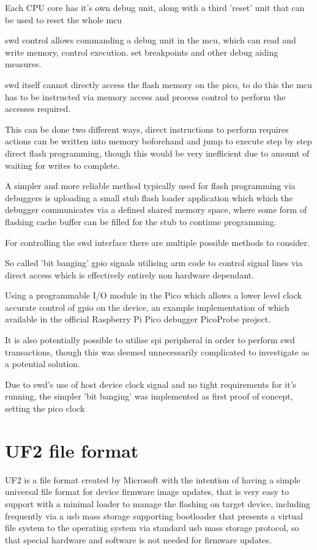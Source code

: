 Each CPU core has it's own debug unit, along with a third 'reset' unit that can be used to reset the whole \gls{mcu}

\gls{swd}  control allows commanding a debug unit in the \gls{mcu}, which can read and write memory, control execution. set breakpoints and other debug aiding measures.

\gls{swd} itself cannot directly access the flash memory on the pico, to do this the \gls{mcu} has to be instructed via memory access and process control to perform the accesses required.

This can be done two different ways, direct instructions to perform requires actions can be written into memory
boforehand and jump to execute step by step direct flash programming, though this would be very inefficient due to amount of waiting for writes to complete.

A simpler and more reliable method typically used for flash programming via debuggers is uploading a small stub flash loader application which which the debugger communicates via a defined shared memory space, where some form of flashing cache buffer can be filled for the stub to continue programming.

For controlling the \gls{swd} interface there are multiple possible methods to consider. 

So called 'bit banging' \gls{gpio} signals utilising \gls{arm} code to control signal lines via direct access which is effectively entirely non hardware dependant.

Using a programmable I/O module in the Pico which allows a lower level clock accurate control of \gls{gpio} on the device, an example implementation of which available in the official Raspberry Pi Pico debugger PicoProbe project\cite{Picoprobe2023}.

It is also potentially possible to utilise \gls{spi} peripheral in order to perform \gls{swd} transactions, though this was deemed unnecessarily complicated to investigate as a potential solution\cite{OpenOCDRaspberryPi}.

Due to \gls{swd}'s use of host device clock signal and no tight requirements for it's running, the simpler 'bit banging' was implemented as first proof of concept, setting the pico clock
\clearpage
\section{UF2 file format}
UF2 is a file format created by Microsoft with the intention of having a simple universal file format for device firmware image updates, that is very easy to support with a minimal loader to manage the flashing on target device, including frequently via a \gls{usb} mass storage supporting bootloader that presents a virtual file system to the operating system via standard \gls{usb} mass storage protocol, so that special hardware and software is not needed for firmware updates.

